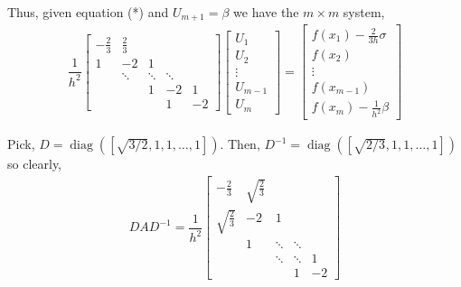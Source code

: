 \documentclass[10pt]{article}
\begin{document}
\begin{solution}[Solution]
\begin{enumerate}
        Thus, given equation (*) and \( U_{m+1} = \beta \) we have the \( m\times m \) system,
        \begin{align*}
            \dfrac{1}{h^2}
            \left[\begin{array}{ccccccc}
                -\frac{2}{3} & \frac{2}{3} \\
                1 & -2 & 1 \\
                & \ddots & \ddots & \ddots \\
                && 1 & -2 & 1 \\
                &&& 1 & -2
            \end{array}\right]
            \left[\begin{array}{c}
                U_1 \\ U_2 \\ \vdots \\ U_{m-1} \\ U_m
            \end{array}\right]
            =
            \left[\begin{array}{c}
                f(x_1) - \frac{2}{3h}\sigma \\ f(x_2) \\ \vdots \\ f(x_{m-1}) \\ f(x_m)  - \frac{1}{h^2}\beta
            \end{array}\right]
        \end{align*}

         Pick, \( D = \operatorname{diag}([\sqrt{3/2}, 1, 1, \ldots, 1]) \). Then, \( D^{-1} = \operatorname{diag}([\sqrt{2/3},1,1,\ldots,1]) \) so clearly,
        \begin{align*}
            DAD^{-1} = 
            \dfrac{1}{h^2}
            \left[\begin{array}{ccccc}
                -\frac{2}{3} & \sqrt{\frac{2}{3}}    \\
                \sqrt{\frac{2}{3}}  & -2 & 1 \\
                & 1 & \ddots & \ddots    \\
                && \ddots & \ddots & 1    \\
                &&& 1  & -2 
            \end{array}\right] 
        \end{align*}

\end{enumerate}

\end{solution}
\end{document}
